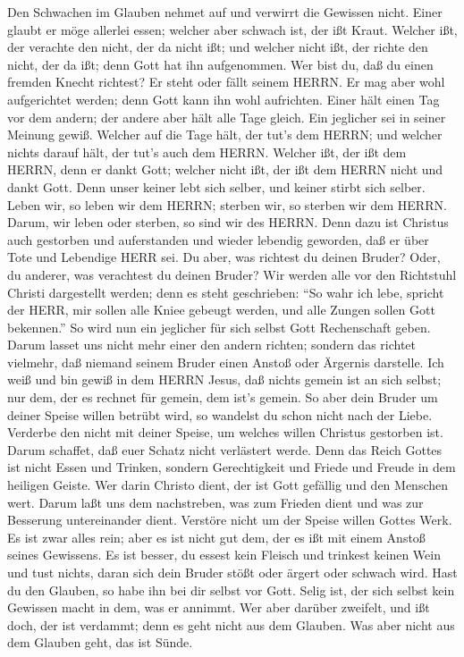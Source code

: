  Den Schwachen im Glauben nehmet auf und verwirrt die
Gewissen nicht.  Einer glaubt er möge allerlei essen;
welcher aber schwach ist, der ißt Kraut.  Welcher ißt, der
verachte den nicht, der da nicht ißt; und welcher nicht ißt, der richte
den nicht, der da ißt; denn Gott hat ihn aufgenommen.  Wer
bist du, daß du einen fremden Knecht richtest? Er steht oder fällt
seinem HERRN. Er mag aber wohl aufgerichtet werden; denn Gott kann ihn
wohl aufrichten.  Einer hält einen Tag vor dem andern; der
andere aber hält alle Tage gleich. Ein jeglicher sei in seiner Meinung
gewiß.  Welcher auf die Tage hält, der tut's dem HERRN; und
welcher nichts darauf hält, der tut's auch dem HERRN. Welcher ißt, der
ißt dem HERRN, denn er dankt Gott; welcher nicht ißt, der ißt dem HERRN
nicht und dankt Gott.  Denn unser keiner lebt sich selber,
und keiner stirbt sich selber.  Leben wir, so leben wir dem
HERRN; sterben wir, so sterben wir dem HERRN. Darum, wir leben oder
sterben, so sind wir des HERRN.  Denn dazu ist Christus auch
gestorben und auferstanden und wieder lebendig geworden, daß er über
Tote und Lebendige HERR sei.  Du aber, was richtest du
deinen Bruder? Oder, du anderer, was verachtest du deinen Bruder? Wir
werden alle vor den Richtstuhl Christi dargestellt werden; 
denn es steht geschrieben: ``So wahr ich lebe, spricht der HERR, mir
sollen alle Kniee gebeugt werden, und alle Zungen sollen Gott
bekennen.''  So wird nun ein jeglicher für sich selbst Gott
Rechenschaft geben.  Darum lasset uns nicht mehr einer den
andern richten; sondern das richtet vielmehr, daß niemand seinem Bruder
einen Anstoß oder Ärgernis darstelle.  Ich weiß und bin
gewiß in dem HERRN Jesus, daß nichts gemein ist an sich selbst; nur dem,
der es rechnet für gemein, dem ist's gemein.  So aber dein
Bruder um deiner Speise willen betrübt wird, so wandelst du schon nicht
nach der Liebe. Verderbe den nicht mit deiner Speise, um welches willen
Christus gestorben ist.  Darum schaffet, daß euer Schatz
nicht verlästert werde.  Denn das Reich Gottes ist nicht
Essen und Trinken, sondern Gerechtigkeit und Friede und Freude in dem
heiligen Geiste.  Wer darin Christo dient, der ist Gott
gefällig und den Menschen wert.  Darum laßt uns dem
nachstreben, was zum Frieden dient und was zur Besserung untereinander
dient.  Verstöre nicht um der Speise willen Gottes Werk. Es
ist zwar alles rein; aber es ist nicht gut dem, der es ißt mit einem
Anstoß seines Gewissens.  Es ist besser, du essest kein
Fleisch und trinkest keinen Wein und tust nichts, daran sich dein Bruder
stößt oder ärgert oder schwach wird.  Hast du den Glauben,
so habe ihn bei dir selbst vor Gott. Selig ist, der sich selbst kein
Gewissen macht in dem, was er annimmt.  Wer aber darüber
zweifelt, und ißt doch, der ist verdammt; denn es geht nicht aus dem
Glauben. Was aber nicht aus dem Glauben geht, das ist Sünde.

